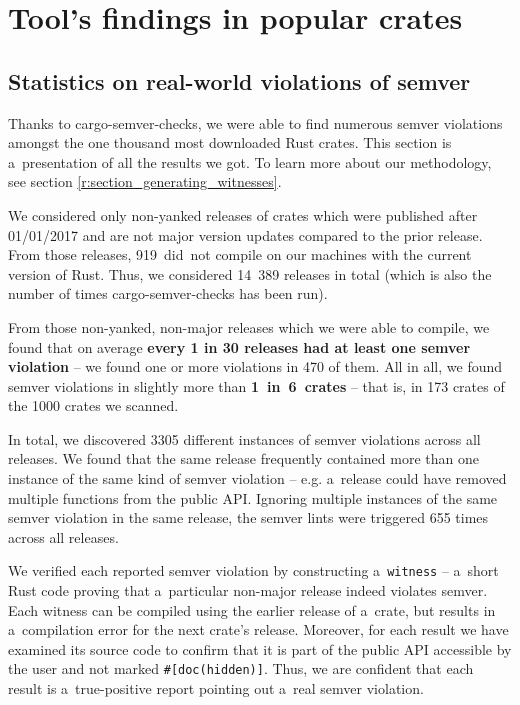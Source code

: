 \documentclass[licencjacka,en]{pracamgr}
\begin{document}

\chapter{Tool's findings in popular crates}\label{r:chapter_semver_crater}

\section{Statistics on real-world violations of semver}\label{r:section_results_statistics}

Thanks to cargo-semver-checks, we were able to find numerous semver violations
amongst the one thousand most downloaded Rust crates.
This section is a~presentation of all the results we got. To learn more about
our methodology, see section \ref{r:section_generating_witnesses}.

We considered only non-yanked releases of crates which were published
after 01/01/2017 and are not major version updates compared to the prior release. From those releases,
\mbox{919 did not} compile on our machines with the current version of Rust.
Thus, we considered \mbox{14 389} releases in total (which is also the number of times
cargo-semver-checks has been run).

From those non-yanked, non-major releases which we were able to compile, we found that
on average \textbf{every 1 in 30 releases had at least one semver violation}
-- we found one or more violations in 470 of them.
All in all, we found semver violations in slightly more than \mbox{\textbf{1 in 6 crates}}
-- that is, in 173 crates of the 1000 crates we scanned.

In total, we discovered 3305 different instances of semver violations across all releases.
We found that the same release frequently contained more than one instance of the same kind of semver violation --
e.g. a~release could have removed multiple functions from the public API. Ignoring multiple instances
of the same semver violation in the same release, the semver lints were triggered 655 times across all releases.

We verified each reported semver violation by constructing a~\texttt{witness} -- a~short Rust code
proving that a~particular non-major release indeed violates semver.
Each witness can be compiled using the earlier release of a~crate,
but results in a~compilation error for the next crate's release.
Moreover, for each result we have examined its source code to confirm
that it is part of the public API accessible by the user and not marked \texttt{\#[doc(hidden)]}. Thus, we are confident that each
result is a~true-positive report pointing out a~real semver violation.
\end{document}
